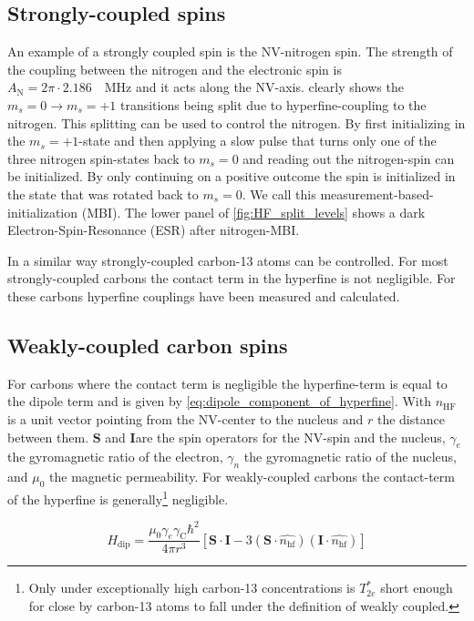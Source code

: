 \subsection{Strongly-coupled spins}
An example of a strongly coupled spin is the NV-nitrogen spin.
The strength of the coupling between the nitrogen and the electronic spin is $A_\mathrm{N} = 2\pi \cdot 2.186\quad \mathrm{MHz} $\citep{Bernien2014Control} and it acts along the NV-axis.
 clearly shows the $m_s =0 \rightarrow m_s=+1$ transitions being split due to hyperfine-coupling to the nitrogen.
This splitting can be used to control the nitrogen.
By first initializing in the $m_s =+1$-state and then applying a slow pulse that turns only one of the three nitrogen spin-states back to $m_s=0$ and reading out the nitrogen-spin can be initialized. By only continuing on a positive outcome the spin is initialized in the state that was rotated back to $m_s =0$. We call this measurement-based-initialization (MBI).
The lower panel of \cref{fig:HF_split_levels} shows a dark Electron-Spin-Resonance (ESR) after nitrogen-MBI.

In a similar way strongly-coupled carbon-13 atoms can be controlled\citep{Robledo2011HighFidelity}.
For most strongly-coupled carbons the contact term in the hyperfine is not negligible.
For these carbons hyperfine couplings have been measured\citep{Smeltzer201113} and calculated\citep{Gali2008Ab,Gali2009Identification}.

\subsection{Weakly-coupled carbon spins}
For carbons where the contact term is negligible the hyperfine-term is equal to the dipole term and is given by \cref{eq:dipole_component_of_hyperfine}\citep{Lange2012Quantum}.
With $n_\mathrm{HF}$ is a unit vector pointing from the NV-center to the nucleus and $r$ the distance between them.
$\mathbf{S}$ and $\mathbf{I}$are the spin operators for the NV-spin and the nucleus, $\gamma_e $ the gyromagnetic ratio of the electron, $\gamma_n$ the gyromagnetic ratio of the nucleus, and $\mu_0$ the magnetic permeability.
For weakly-coupled carbons the contact-term of the hyperfine is generally\footnote{Only under exceptionally high carbon-13 concentrations is $T_{2e}^*$ short enough for close by carbon-13 atoms to fall under the definition of weakly coupled. } negligible.

\begin{equation}
\label{eq:dipole_component_of_hyperfine}
H_{\mathrm{dip}} = \frac{\mu_0 \gamma_e \gamma_{\mathrm{C}} \hbar^2 }{4 \pi r^3} [ \bm{S \cdot I} - 3 (\bm S \cdot \hat{n_{\mathrm{hf}}})(\bm I \cdot \hat{n_{\mathrm{hf}}})]
\end{equation}

